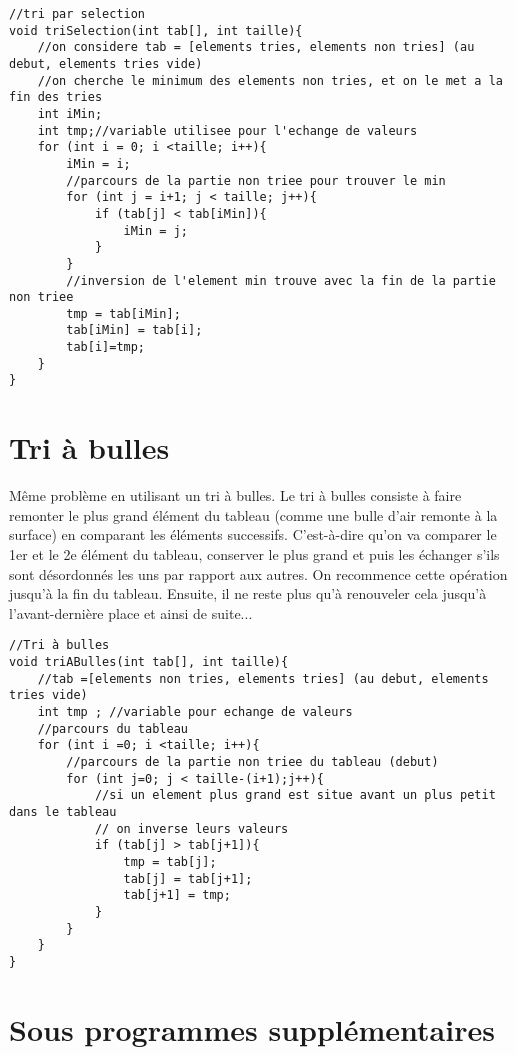 \documentclass[french]{article}
\begin{document}
\begin{lstlisting}[caption={Tri par selection}]
//tri par selection
void triSelection(int tab[], int taille){
    //on considere tab = [elements tries, elements non tries] (au debut, elements tries vide)
    //on cherche le minimum des elements non tries, et on le met a la fin des tries
    int iMin;
    int tmp;//variable utilisee pour l'echange de valeurs
    for (int i = 0; i <taille; i++){
        iMin = i;
        //parcours de la partie non triee pour trouver le min
        for (int j = i+1; j < taille; j++){
            if (tab[j] < tab[iMin]){
                iMin = j;
            }
        }
        //inversion de l'element min trouve avec la fin de la partie non triee
        tmp = tab[iMin];
        tab[iMin] = tab[i];
        tab[i]=tmp;
    }
}
\end{lstlisting}
\section{Tri à bulles}
Même problème en utilisant un tri à bulles. Le tri à bulles consiste à faire remonter le plus grand élément du tableau (comme une bulle d'air remonte à la surface) en comparant les éléments successifs. C'est-à-dire qu'on va comparer le 1er et le 2e élément du tableau, conserver le plus grand et puis les échanger s'ils sont désordonnés les uns par rapport aux autres. On recommence cette opération jusqu'à la fin du tableau. Ensuite, il ne reste plus qu'à renouveler cela jusqu'à l'avant-dernière place et ainsi de suite...

\begin{lstlisting}[caption={Tri à bulles}]
//Tri à bulles
void triABulles(int tab[], int taille){
    //tab =[elements non tries, elements tries] (au debut, elements tries vide)
    int tmp ; //variable pour echange de valeurs
    //parcours du tableau
    for (int i =0; i <taille; i++){
        //parcours de la partie non triee du tableau (debut)
        for (int j=0; j < taille-(i+1);j++){
            //si un element plus grand est situe avant un plus petit dans le tableau
            // on inverse leurs valeurs
            if (tab[j] > tab[j+1]){
                tmp = tab[j];
                tab[j] = tab[j+1];
                tab[j+1] = tmp;
            }
        }
    }
}
\end{lstlisting}
	
	\section*{Sous programmes supplémentaires}
	
\end{document}
